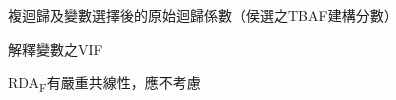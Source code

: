 \documentclass[10pt, aspectratio=1610, xcolor=table]{beamer}
\begin{document}
\begin{frame}[label=coef]{複迴歸及變數選擇後的原始迴歸係數（侯選之TBAF建構分數）}

\end{frame}


\begin{frame}[label=coef]{解釋變數之VIF}

\centering RDA\textsubscript{F}有嚴重共線性，應不考慮
\end{frame}




%
%
%
\end{document}
